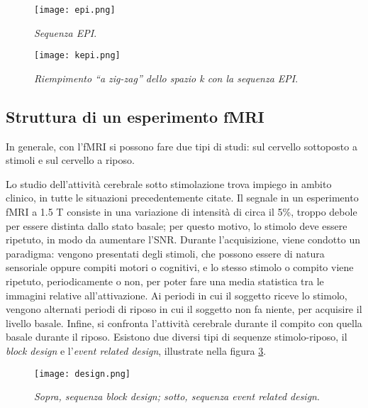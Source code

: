\documentclass{report}
\newcommand{\virgolette}[1]{``#1''}
\newcommand{\figref}[1]{figura \ref{#1}}
\numberwithin{equation}{section}
\numberwithin{figure}{section}
\begin{document}
\vspace{10 pt}

\begin{figure}[htp]
\centering
\texttt{[image: epi.png]}
\caption{\label{fig:epi} \textit{Sequenza EPI}.}
\end{figure}

\vspace{10 pt}

\begin{figure}[htp]
\centering
\texttt{[image: kepi.png]}
\caption{\label{fig:kepi} \textit{Riempimento \virgolette{a zig-zag} dello spazio k con la sequenza EPI}.}
\end{figure}

\newpage

\subsection{Struttura di un esperimento fMRI}
In generale, con l'fMRI si possono fare due tipi di studi: sul cervello sottoposto a stimoli e sul cervello a riposo.

Lo studio dell'attività cerebrale sotto stimolazione trova impiego in ambito clinico, in tutte le situazioni precedentemente citate. Il segnale in un esperimento fMRI a 1.5 T consiste in una variazione di intensità di circa il 5\%, troppo debole per essere distinta dallo stato basale; per questo motivo, lo stimolo deve essere ripetuto, in modo da aumentare l'SNR. Durante l’acquisizione, viene condotto un paradigma: vengono presentati degli stimoli, che possono essere di natura sensoriale oppure compiti motori o cognitivi, e lo stesso stimolo o compito viene ripetuto, periodicamente o non, per poter fare una media statistica tra le immagini relative all'attivazione. Ai periodi in cui il soggetto riceve lo stimolo, vengono alternati periodi di riposo in cui il soggetto non fa niente, per acquisire il livello basale. Infine, si confronta l’attività cerebrale durante il compito con quella basale durante il riposo. Esistono due diversi tipi di sequenze stimolo-riposo, il \textit{block design} e l'\textit{event related design}, illustrate nella \figref{fig:design}.

\begin{figure}[htp]
\centering
\texttt{[image: design.png]}
\caption{\label{fig:design} \textit{Sopra, sequenza block design; sotto, sequenza event related design}.}
\end{figure}
\end{document}
